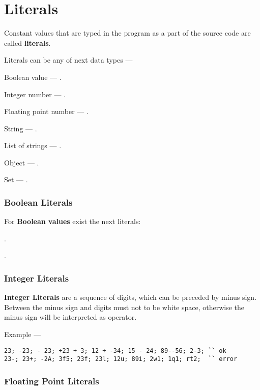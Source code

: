 \section{Literals}

Constant values that are typed in the program as a part of the source code are called {\bf literals}.

Literals can be any of next data types —

\begin{icItems}
	\item
		Boolean value — \bool{}.
	\item
		Integer number — \integer{}.
	\item
		Floating point number — \double{}.
	\item
		String — \str{}.
	\item
		List of strings — \listtype{}.
	\item
		Object — \object{}.
	\item
		Set — \set{}.
\end{icItems}

\subsubsection{Boolean Literals}

For {\bf Boolean values} exist the next literals:
\begin{icItems}
	\item \true{}.
	\item \false{}.
\end{icItems}

\subsubsection{Integer Literals}

{\bf Integer Literals} are a sequence of digits, which can be preceded by minus sign. Between the minus sign and digits must not to be white space, otherwise the minus sign will be interpreted as operator.

Example —
\begin{verbatim}
23; -23; - 23; +23 + 3; 12 + -34; 15 - 24; 89--56; 2-3; `` ok
23-; 23+; -2A; 3f5; 23f; 23l; 12u; 89i; 2w1; 1q1; rt2;  `` error
\end{verbatim}

\subsubsection{Floating Point Literals}

